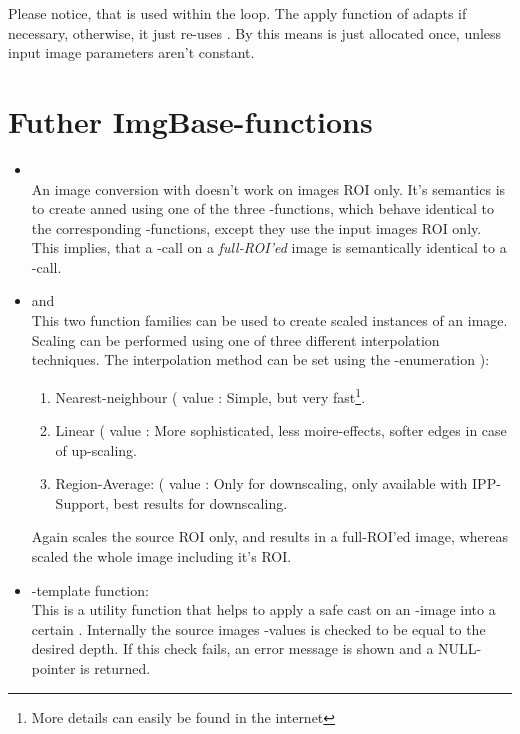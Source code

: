 
Please notice, that  is used within the loop. The apply function of  adapts  if necessary, otherwise, it just re-uses . By this means  is just allocated once, unless input image parameters aren't constant.


\section{Futher ImgBase-functions}


\begin{itemize}
\item {}\\
An image conversion with  doesn't work on images ROI only. It's semantics is to create anned using one of the three -functions, which behave identical to the corresponding -functions, except they use the input images ROI only. This implies, that a -call on a \emph{full-ROI'ed} image is semantically identical to a -call.
\item {} and \\
This two function families can be used to create scaled instances of an image. Scaling can be performed using one of three different interpolation techniques. The interpolation method can be set using the -enumeration ):
\begin{enumerate}
  \item Nearest-neighbour ( value :  Simple, but very fast\footnote{More details can easily be found in the internet}.
  \item Linear ( value : More sophisticated, less moire-effects, softer edges in case of up-scaling.
  \item Region-Average: ( value : Only for downscaling, only available with IPP-Support, best results for downscaling.  
\end{enumerate}
Again  scales the source ROI only, and results in a full-ROI'ed image, whereas  scaled the whole image including it's ROI.
\item {}-template function:\\
This is a utility function that helps to apply a safe cast on an -image into a certain . Internally the source images -values is checked to be equal to the desired depth. If this check fails, an error message is shown and a NULL-pointer is returned.

\end{itemize}

